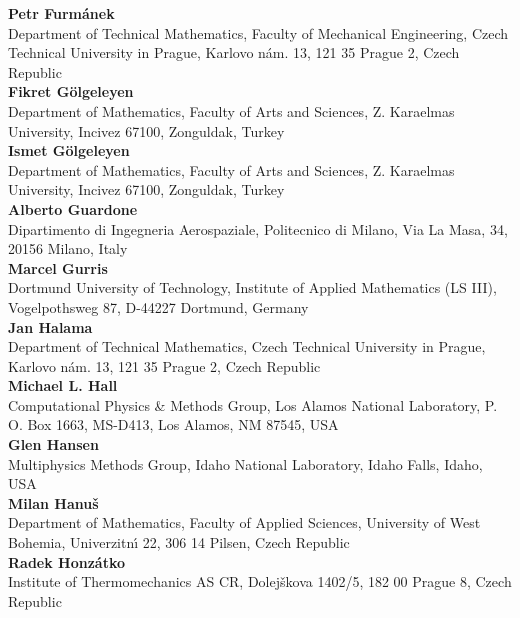 \noindent
{\bf Petr Furm\'anek}\\
Department of Technical Mathematics,
Faculty of Mechanical Engineering,
Czech Technical University in Prague,
Karlovo n\'am. 13,
121 35 Prague 2,
Czech Republic\\

\noindent
{\bf Fikret G\"{o}lgeleyen}\\
Department of Mathematics,
Faculty of Arts and Sciences,
Z. Karaelmas University,
Incivez 67100,
Zonguldak,
Turkey\\

\noindent
{\bf Ismet G\"{o}lgeleyen}\\
Department of Mathematics,
Faculty of Arts and Sciences,
Z. Karaelmas University,
Incivez 67100,
Zonguldak,
Turkey\\

\noindent
{\bf Alberto Guardone}\\
Dipartimento di Ingegneria Aerospaziale,
Politecnico di Milano,
Via La Masa, 34,
20156 Milano,
Italy\\

\noindent
{\bf Marcel Gurris}\\
Dortmund University of Technology,
Institute of Applied Mathematics (LS III),
Vogelpothsweg 87,
D-44227 Dortmund,
Germany\\

\noindent
{\bf Jan Halama}\\
Department of Technical Mathematics,
Czech Technical University in Prague,
Karlovo n\'am. 13,
121 35 Prague 2,
Czech Republic\\

\noindent
{\bf Michael L. Hall}\\
Computational Physics \& Methods Group,
Los Alamos National Laboratory,
P. O. Box 1663, MS-D413,
Los Alamos, NM 87545,
USA\\

\noindent
{\bf Glen Hansen }\\
Multiphysics Methods Group,
Idaho National Laboratory, 
Idaho Falls,
Idaho,
USA\\

\noindent
{\bf Milan Hanu\v s}\\
Department of Mathematics,
Faculty of Applied Sciences,
University of West Bohemia,
Univerzitn\'{\i} 22,
306 14 Pilsen,
Czech Republic\\

\noindent
{\bf Radek Honz\'atko}\\
Institute of Thermomechanics AS CR,
Dolej\v skova 1402/5,
182 00 Prague 8,
Czech Republic\\

